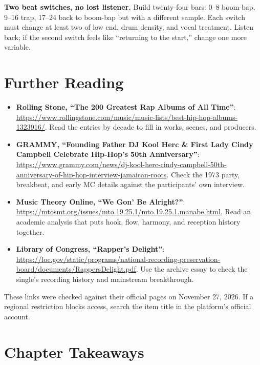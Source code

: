 \begin{exercise}
\textbf{Two beat switches, no lost listener.} Build twenty-four bars: 0--8 boom-bap, 9--16 trap, 17--24 back to boom-bap but with a different sample. Each switch must change at least two of low end, drum density, and vocal treatment. Listen back; if the second switch feels like ``returning to the start,'' change one more variable.
\end{exercise}

\section{Further Reading}
\label{sec:hiphop-reading}

\begin{sloppypar}
\begin{itemize}
\item \textbf{Rolling Stone, ``The 200 Greatest Rap Albums of All Time''}: \url{https://www.rollingstone.com/music/music-lists/best-hip-hop-albums-1323916/}. Read the entries by decade to fill in works, scenes, and producers.
\item \textbf{GRAMMY, ``Founding Father DJ Kool Herc \& First Lady Cindy Campbell Celebrate Hip-Hop's 50th Anniversary''}: \url{https://www.grammy.com/news/dj-kool-herc-cindy-campbell-50th-anniversary-of-hip-hop-interview-jamaican-roots}. Check the 1973 party, breakbeat, and early MC details against the participants' own interview.
\item \textbf{Music Theory Online, ``We Gon' Be Alright?''}: \url{https://mtosmt.org/issues/mto.19.25.1/mto.19.25.1.manabe.html}. Read an academic analysis that puts hook, flow, harmony, and reception history together.
\item \textbf{Library of Congress, ``Rapper's Delight''}: \url{https://loc.gov/static/programs/national-recording-preservation-board/documents/RappersDelight.pdf}. Use the archive essay to check the single's recording history and mainstream breakthrough.
\end{itemize}
\end{sloppypar}

These links were checked against their official pages on November 27, 2026. If a regional restriction blocks access, search the item title in the platform's official account.

\section{Chapter Takeaways}
\label{sec:hiphop-takeaways}

